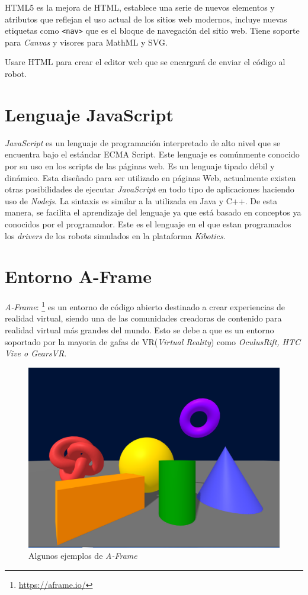 HTML5 es la mejora de HTML, establece una serie de nuevos elementos y atributos que reflejan el uso actual de los sitios web modernos, incluye nuevas etiquetas como \texttt{<nav>} que es el bloque de navegación del sitio web. Tiene soporte para \textit{Canvas} y visores para MathML y SVG.\newline

Usare HTML para crear el editor web que se encargará de enviar el código al robot.

\section{Lenguaje JavaScript}
\label{sec:js}
\textit{JavaScript} es un lenguaje de programación interpretado de alto nivel que se encuentra bajo el estándar ECMA Script. Este lenguaje es comúnmente conocido por su uso en los scripts de las páginas web. Es un lenguaje tipado débil y dinámico. Esta diseñado para ser utilizado en páginas Web, actualmente existen otras posibilidades de ejecutar \textit{JavaScript} en todo tipo de aplicaciones haciendo uso de \textit{Nodejs}.\newline
La sintaxis es similar a la utilizada en Java y C++. De esta manera, se facilita el aprendizaje del lenguaje ya que está basado en conceptos ya conocidos por el programador.\newline
Este es el lenguaje en el que estan programados los \textit{drivers} de los robots simulados en la plataforma \textit{Kibotics}. 
\section{Entorno A-Frame}
\label{sec:aframe}
\textit{A-Frame}: \footnote{\url{https://aframe.io/}}  es un entorno de código abierto destinado a crear experiencias de realidad virtual, siendo una de las comunidades creadoras de contenido para realidad virtual más grandes del mundo. Esto se debe a que es un entorno soportado por la mayoria de gafas de VR(\textit{Virtual Reality}) como \textit{OculusRift, HTC Vive o GearsVR}.\newline
\begin{figure}[ht]
    \centering
    \includegraphics[width=1\textwidth]{img/Aframe.png}
    \caption{Algunos ejemplos de \textit{A-Frame}} 
    \label{fig:A-Frame}
\end{figure}

